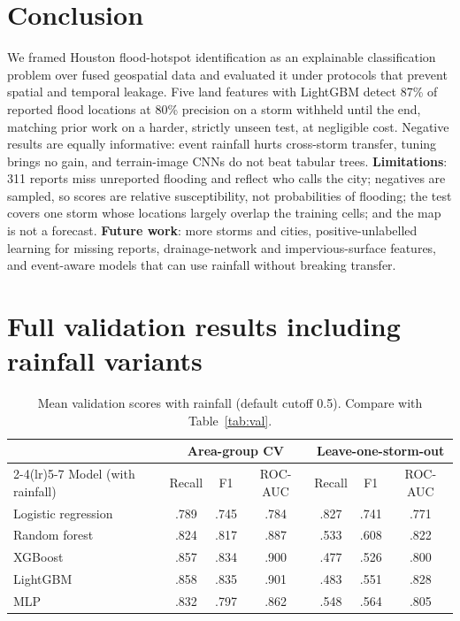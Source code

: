 \documentclass{article}
\begin{document}
\section{Conclusion}
We framed Houston flood-hotspot identification as an explainable classification problem over fused geospatial data and evaluated it under protocols that prevent spatial and temporal leakage. Five land features with LightGBM detect 87\% of reported flood locations at 80\% precision on a storm withheld until the end, matching prior work on a harder, strictly unseen test, at negligible cost. Negative results are equally informative: event rainfall hurts cross-storm transfer, tuning brings no gain, and terrain-image CNNs do not beat tabular trees. \textbf{Limitations}: 311 reports miss unreported flooding and reflect who calls the city; negatives are sampled, so scores are relative susceptibility, not probabilities of flooding; the test covers one storm whose locations largely overlap the training cells; and the map is not a forecast. \textbf{Future work}: more storms and cities, positive-unlabelled learning for missing reports, drainage-network and impervious-surface features, and event-aware models that can use rainfall without breaking transfer.




\appendix
\section{Full validation results including rainfall variants}
\begin{table}[h]
\centering\small
\caption{Mean validation scores with rainfall (default cutoff 0.5). Compare with Table~\ref{tab:val}.}
\begin{tabular}{l ccc ccc}
\toprule
 & \multicolumn{3}{c}{Area-group CV} & \multicolumn{3}{c}{Leave-one-storm-out}\\
\cmidrule(lr){2-4}\cmidrule(lr){5-7}
Model (with rainfall) & Recall & F1 & ROC-AUC & Recall & F1 & ROC-AUC\\
\midrule
Logistic regression & .789 & .745 & .784 & .827 & .741 & .771\\
Random forest & .824 & .817 & .887 & .533 & .608 & .822\\
XGBoost & .857 & .834 & .900 & .477 & .526 & .800\\
LightGBM & .858 & .835 & .901 & .483 & .551 & .828\\
MLP & .832 & .797 & .862 & .548 & .564 & .805\\
\bottomrule
\end{tabular}
\end{table}
\end{document}
